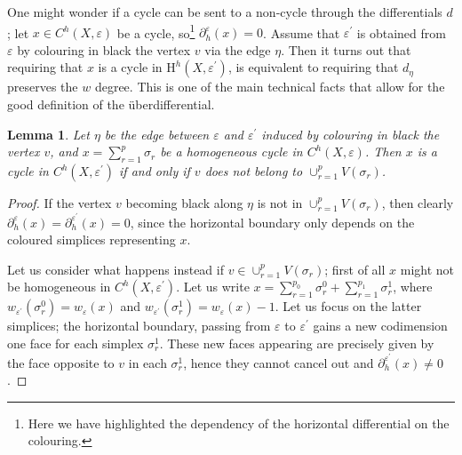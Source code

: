 \documentclass[11pt, a4paper, reqno, twoside, makeidx]{amsart}
\theoremstyle{remark}
\theoremstyle{plain}
\newtheorem{lem}[thm]{Lemma}
\theoremstyle{definition}
\newcommand{\HH}{\mathrm{H}}
\begin{document}
One might wonder if a cycle can be sent to a non-cycle through the differentials $d$; let $x \in C^h(X, \varepsilon)$ be a cycle, so\footnote{Here we have highlighted the dependency of the horizontal differential on the colouring.} 
$\partial_h^\varepsilon (x) = 0$. Assume that $\varepsilon^\prime$ is obtained from $\varepsilon$ by colouring in black the vertex $v$ via the edge $\eta$. Then it turns out that requiring that $x$ is a cycle in $\HH^h(X, \varepsilon^\prime)$, is equivalent to requiring that $d_\eta$ preserves the $w$ degree. This is one of the main technical facts that allow for the good definition of the \"uberdifferential. 

\begin{lem}\label{lem:techinical}
Let $\eta$ be the edge between $\varepsilon$ and $\varepsilon^\prime$ induced by colouring in black the vertex $v$, and $x = \sum_{r =1}^p \sigma_r$ be a homogeneous cycle in $C^h(X,\varepsilon)$. Then $x$ is a cycle in $C^h(X, \varepsilon^\prime)$ if and only if  $v$ does not belong to $\cup_{r=1}^p V(\sigma_r)$.
\end{lem}
\begin{proof}
If the vertex $v$ becoming black along $\eta$ is not in $\cup_{r=1}^p V(\sigma_r)$, then clearly $\partial_h^\varepsilon (x) = \partial_h^{\varepsilon^\prime} (x) = 0$, since the horizontal boundary only depends on the coloured simplices representing $x$.

Let us consider what happens instead if $v \in \cup_{r=1}^p V(\sigma_r)$; first of all $x$ might not be homogeneous in $C^h(X, \varepsilon^\prime)$. Let us write $x = \sum_{r = 1}^{p_0} \sigma_r^0 +\sum_{r = 1}^{p_1} \sigma_r^1 $, where $w_{\varepsilon^\prime} (\sigma_r^0) = w_{\varepsilon} (x) $ and $w_{\varepsilon^\prime} (\sigma_r^1) = w_{\varepsilon} (x) -1$. Let us focus on the latter simplices; the horizontal boundary, passing from $\varepsilon$ to $\varepsilon^\prime$ gains a new codimension one face for each simplex $\sigma_r^1$. These new faces appearing are precisely given by the face opposite to $v$ in each $\sigma_r^1$, hence they cannot cancel out and $\partial_h^{\varepsilon^\prime} (x) \neq 0$.
\end{proof}
\end{document}
